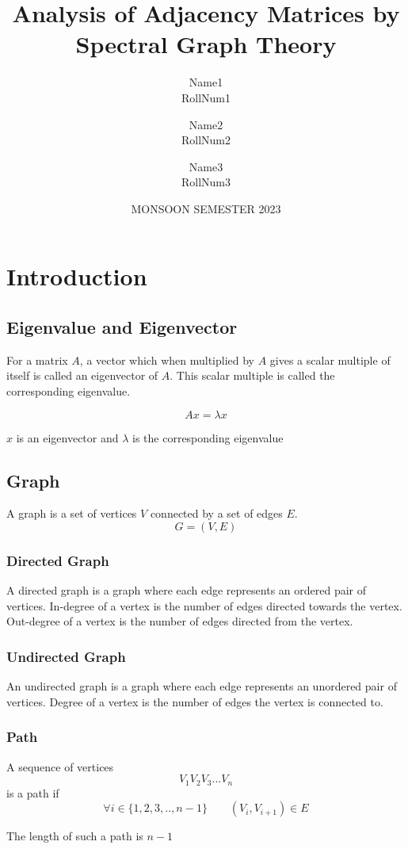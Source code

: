 \documentclass[12pt, a4paper]{article}
\title{Analysis of Adjacency Matrices by Spectral Graph Theory}
\author{
  Name1 \\
  RollNum1
  \and
  Name2 \\
  RollNum2
  \and
  Name3 \\
  RollNum3
}
\date{MONSOON SEMESTER 2023}
\begin{document}
    \begin{titlepage}
      \maketitle
      \thispagestyle{empty}
    \end{titlepage}

    \section{Introduction}

      \subsection{Eigenvalue and Eigenvector}
      \begin{flushleft}
      For a matrix $A$, a vector which when multiplied by $A$ gives a scalar multiple of itself is called an eigenvector of $A$. This scalar multiple is called the corresponding eigenvalue.

      $$Ax = \lambda x$$

      $x$ is an eigenvector and $\lambda$ is the corresponding eigenvalue

      \end{flushleft}
      \subsection{Graph}
      A graph is a set of vertices $V$ connected by a set of edges $E$.  
      $$G = (V, E)$$
        \subsubsection{Directed Graph}
        A directed graph is a graph where each edge represents an ordered pair of vertices. In-degree of a vertex is the number of edges directed towards the vertex. Out-degree of a vertex is the number of edges directed from the vertex.
        \subsubsection{Undirected Graph}
        An undirected graph is a graph where each edge represents an unordered pair of vertices. Degree of a vertex is the number of edges the vertex is connected to.

        \subsubsection{Path}
        \begin{flushleft}
        A sequence of vertices $$V_1V_2V_3...V_n$$ is a path if 
        $$\forall i \in \{1,2,3,..,n-1\} \qquad (V_{i}, V_{i+1}) \in E$$

        The length of such a path is $n-1$
        \end{flushleft}
\end{document}
